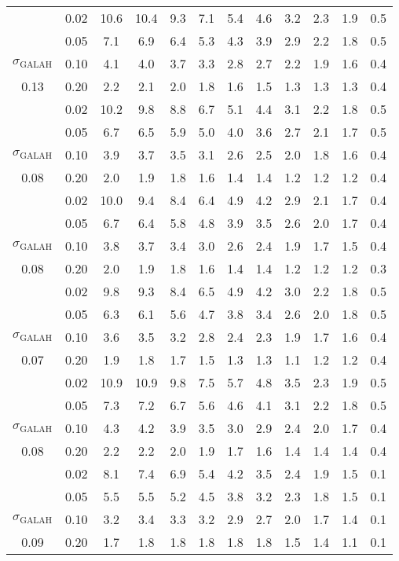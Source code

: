 \begin{tabular}{cccccccccccc}
\hline
[V/H] & 0.02 & 10.6 & 10.4 & 9.3 & 7.1 & 5.4 & 4.6 & 3.2 & 2.3 & 1.9 & 0.5 \\
 & 0.05 & 7.1 & 6.9 & 6.4 & 5.3 & 4.3 & 3.9 & 2.9 & 2.2 & 1.8 & 0.5 \\
$\sigma_\mathrm{GALAH}$ & 0.10 & 4.1 & 4.0 & 3.7 & 3.3 & 2.8 & 2.7 & 2.2 & 1.9 & 1.6 & 0.4 \\
0.13 & 0.20 & 2.2 & 2.1 & 2.0 & 1.8 & 1.6 & 1.5 & 1.3 & 1.3 & 1.3 & 0.4 \\
\hline
[Cr/H] & 0.02 & 10.2 & 9.8 & 8.8 & 6.7 & 5.1 & 4.4 & 3.1 & 2.2 & 1.8 & 0.5 \\
 & 0.05 & 6.7 & 6.5 & 5.9 & 5.0 & 4.0 & 3.6 & 2.7 & 2.1 & 1.7 & 0.5 \\
$\sigma_\mathrm{GALAH}$ & 0.10 & 3.9 & 3.7 & 3.5 & 3.1 & 2.6 & 2.5 & 2.0 & 1.8 & 1.6 & 0.4 \\
0.08 & 0.20 & 2.0 & 1.9 & 1.8 & 1.6 & 1.4 & 1.4 & 1.2 & 1.2 & 1.2 & 0.4 \\
\hline
[Mn/H] & 0.02 & 10.0 & 9.4 & 8.4 & 6.4 & 4.9 & 4.2 & 2.9 & 2.1 & 1.7 & 0.4 \\
 & 0.05 & 6.7 & 6.4 & 5.8 & 4.8 & 3.9 & 3.5 & 2.6 & 2.0 & 1.7 & 0.4 \\
$\sigma_\mathrm{GALAH}$ & 0.10 & 3.8 & 3.7 & 3.4 & 3.0 & 2.6 & 2.4 & 1.9 & 1.7 & 1.5 & 0.4 \\
0.08 & 0.20 & 2.0 & 1.9 & 1.8 & 1.6 & 1.4 & 1.4 & 1.2 & 1.2 & 1.2 & 0.3 \\
\hline
[Fe/H] & 0.02 & 9.8 & 9.3 & 8.4 & 6.5 & 4.9 & 4.2 & 3.0 & 2.2 & 1.8 & 0.5 \\
 & 0.05 & 6.3 & 6.1 & 5.6 & 4.7 & 3.8 & 3.4 & 2.6 & 2.0 & 1.8 & 0.5 \\
$\sigma_\mathrm{GALAH}$ & 0.10 & 3.6 & 3.5 & 3.2 & 2.8 & 2.4 & 2.3 & 1.9 & 1.7 & 1.6 & 0.4 \\
0.07 & 0.20 & 1.9 & 1.8 & 1.7 & 1.5 & 1.3 & 1.3 & 1.1 & 1.2 & 1.2 & 0.4 \\
\hline
[Co/H] & 0.02 & 10.9 & 10.9 & 9.8 & 7.5 & 5.7 & 4.8 & 3.5 & 2.3 & 1.9 & 0.5 \\
 & 0.05 & 7.3 & 7.2 & 6.7 & 5.6 & 4.6 & 4.1 & 3.1 & 2.2 & 1.8 & 0.5 \\
$\sigma_\mathrm{GALAH}$ & 0.10 & 4.3 & 4.2 & 3.9 & 3.5 & 3.0 & 2.9 & 2.4 & 2.0 & 1.7 & 0.4 \\
0.08 & 0.20 & 2.2 & 2.2 & 2.0 & 1.9 & 1.7 & 1.6 & 1.4 & 1.4 & 1.4 & 0.4 \\
\hline
[Ba/H] & 0.02 & 8.1 & 7.4 & 6.9 & 5.4 & 4.2 & 3.5 & 2.4 & 1.9 & 1.5 & 0.1 \\
 & 0.05 & 5.5 & 5.5 & 5.2 & 4.5 & 3.8 & 3.2 & 2.3 & 1.8 & 1.5 & 0.1 \\
$\sigma_\mathrm{GALAH}$ & 0.10 & 3.2 & 3.4 & 3.3 & 3.2 & 2.9 & 2.7 & 2.0 & 1.7 & 1.4 & 0.1 \\
0.09 & 0.20 & 1.7 & 1.8 & 1.8 & 1.8 & 1.8 & 1.8 & 1.5 & 1.4 & 1.1 & 0.1 \\
\hline
\hline
\end{tabular}
